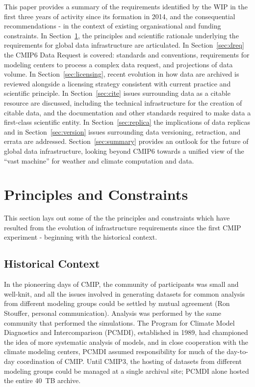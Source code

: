 \documentclass[gmd,manuscript]{copernicus}
\newcommand{\secref}[1] {\mbox{Section  \ref{sec:#1}}}
\begin{document}
This paper provides a summary of the requirements identified by the WIP in
the first three years of activity since its formation in 2014, and
the consequential recommendations - in the context of existing
organisational and funding constraints. 
In \secref{principles}, the principles and scientific rationale
underlying the requirements for global data infrastructure are
articulated. In \secref{dreq} the CMIP6 Data Request is covered:
standards and conventions, requirements for modeling centers to
process a complex data request, and projections of data volume. 
In \secref{licensing}, recent
evolution in how data are archived is reviewed alongside a licensing
strategy consistent with current practice and scientific principle. In
\secref{cite} issues surrounding data as a citable resource are
discussed, including the technical infrastructure for the creation of
citable data, and the documentation and other standards required to
make data a first-class scientific entity. In \secref{replica} the
implications of data replicas and in \secref{version} issues
surrounding data versioning, retraction, and errata are addressed.
\secref{summary} provides an outlook for the future of global data
infrastructure, looking beyond CMIP6 towards a unified view of
the ``vast machine'' for weather and climate computation and data.


\section{Principles and Constraints}
\label{sec:principles}

This section lays out some of the the principles and constraints
which have resulted from the evolution of infrastructure requirements since
the first CMIP experiment - beginning with the historical context.

\subsection{Historical Context}

 In the pioneering days of CMIP, the community of participants was
small and well-knit, and all the issues involved in generating
datasets for common analysis from different modeling groups could be
settled by mutual agreement (Ron Stouffer, personal communication).
Analysis was performed by the same community that performed the
simulations. The Program for Climate Model Diagnostics and
Intercomparison (PCMDI), established in 1989, had championed the idea
of more systematic analysis of models, and in close cooperation with
the climate modeling centers, PCMDI assumed responsibility for
much of the day-to-day coordination of CMIP. Until CMIP3, the hosting
of datasets from different modeling groups could be managed at a
single archival site; PCMDI alone hosted the entire 40~TB archive.
\end{document}
